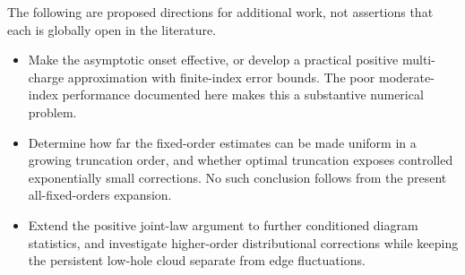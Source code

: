 \documentclass[11pt]{article}
\theoremstyle{remark}\newtheorem{remark}[theorem]{Remark}
\begin{document}
The following are proposed directions for additional work, not assertions that each is globally open in the literature.
\begin{itemize}
\item Make the asymptotic onset effective, or develop a practical positive multi-charge approximation with finite-index error bounds. The poor moderate-index performance documented here makes this a substantive numerical problem.
\item Determine how far the fixed-order estimates can be made uniform in a growing truncation order, and whether optimal truncation exposes controlled exponentially small corrections. No such conclusion follows from the present all-fixed-orders expansion.
\item Extend the positive joint-law argument to further conditioned diagram statistics, and investigate higher-order distributional corrections while keeping the persistent low-hole cloud separate from edge fluctuations.
\end{itemize}
\end{document}
